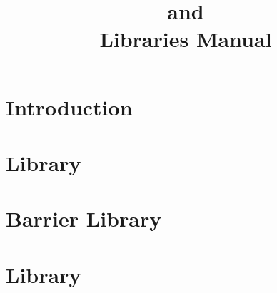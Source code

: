\documentclass[10pt]{report}
\title{\converse{} and \charmpp{}\\ Libraries Manual}
\begin{document}
\maketitle

\chapter{Introduction}

\chapter{\irecv{} Library}

\chapter{Barrier Library}

\chapter{\tempo{} Library}



\end{document}
